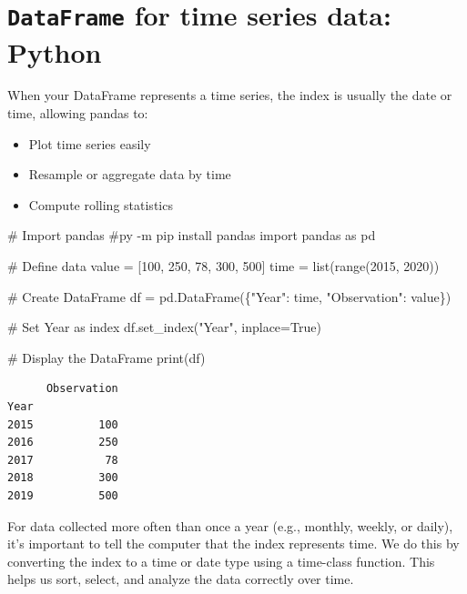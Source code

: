 \documentclass[
  11pt,
  a4paper,
]{report}
\newenvironment{Shaded}{\begin{snugshade}}{\end{snugshade}}
\newcommand{\BuiltInTok}[1]{\textcolor[rgb]{0.00,0.23,0.31}{#1}}
\newcommand{\CommentTok}[1]{\textcolor[rgb]{0.37,0.37,0.37}{#1}}
\newcommand{\DecValTok}[1]{\textcolor[rgb]{0.68,0.00,0.00}{#1}}
\newcommand{\ImportTok}[1]{\textcolor[rgb]{0.00,0.46,0.62}{#1}}
\newcommand{\NormalTok}[1]{\textcolor[rgb]{0.00,0.23,0.31}{#1}}
\newcommand{\OperatorTok}[1]{\textcolor[rgb]{0.37,0.37,0.37}{#1}}
\newcommand{\StringTok}[1]{\textcolor[rgb]{0.13,0.47,0.30}{#1}}
\newcommand{\VariableTok}[1]{\textcolor[rgb]{0.07,0.07,0.07}{#1}}
\begin{document}
\section{\texorpdfstring{\texttt{DataFrame} for time series data:
Python}{DataFrame for time series data: Python}}\label{dataframe-for-time-series-data-python}

When your DataFrame represents a time series, the index is usually the
date or time, allowing pandas to:

\begin{itemize}
\item
  Plot time series easily
\item
  Resample or aggregate data by time
\item
  Compute rolling statistics
\end{itemize}

\begin{Shaded}
\begin{Highlighting}[]
\CommentTok{\# Import pandas}
\CommentTok{\#py {-}m pip install pandas}
\ImportTok{import}\NormalTok{ pandas }\ImportTok{as}\NormalTok{ pd}

\CommentTok{\# Define data}
\NormalTok{value }\OperatorTok{=}\NormalTok{ [}\DecValTok{100}\NormalTok{, }\DecValTok{250}\NormalTok{, }\DecValTok{78}\NormalTok{, }\DecValTok{300}\NormalTok{, }\DecValTok{500}\NormalTok{]}
\NormalTok{time }\OperatorTok{=} \BuiltInTok{list}\NormalTok{(}\BuiltInTok{range}\NormalTok{(}\DecValTok{2015}\NormalTok{, }\DecValTok{2020}\NormalTok{))}

\CommentTok{\# Create DataFrame}
\NormalTok{df }\OperatorTok{=}\NormalTok{ pd.DataFrame(\{}\StringTok{"Year"}\NormalTok{: time, }\StringTok{"Observation"}\NormalTok{: value\})}

\CommentTok{\# Set \textquotesingle{}Year\textquotesingle{} as index}
\NormalTok{df.set\_index(}\StringTok{"Year"}\NormalTok{, inplace}\OperatorTok{=}\VariableTok{True}\NormalTok{)}

\CommentTok{\# Display the DataFrame}
\BuiltInTok{print}\NormalTok{(df)}
\end{Highlighting}
\end{Shaded}

\begin{verbatim}
      Observation
Year             
2015          100
2016          250
2017           78
2018          300
2019          500
\end{verbatim}

For data collected more often than once a year (e.g., monthly, weekly,
or daily), it's important to tell the computer that the index represents
time. We do this by converting the index to a time or date type using a
time-class function. This helps us sort, select, and analyze the data
correctly over time.
\end{document}
